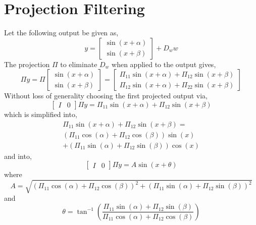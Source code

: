 \section{Projection Filtering}
Let the following output be given as,
\begin{equation}
    y=\begin{bmatrix}
        \sin(x+\alpha)\\ \sin(x+\beta)
    \end{bmatrix}+D_w w
\end{equation}
The projection $\Pi$ to eliminate $D_w$ when applied to the output gives,
\begin{equation}
    \Pi y=\Pi\begin{bmatrix}
        \sin(x+\alpha)\\ \sin(x+\beta)
    \end{bmatrix}=\begin{bmatrix}
        \Pi_{11}\sin(x+\alpha)+\Pi_{12}\sin(x+\beta)\\
        \Pi_{12}\sin(x+\alpha)+\Pi_{22}\sin(x+\beta)
    \end{bmatrix}
\end{equation}
Without loss of generality choosing the first projected output via,
\begin{equation}
    \begin{bmatrix}I& 0\end{bmatrix}\Pi y=\Pi_{11}\sin(x+\alpha)+\Pi_{12}\sin(x+\beta)
\end{equation}
which is simplified into,
\begin{gather}
   \Pi_{11}\sin(x+\alpha)+\Pi_{12}\sin(x+\beta)=\\
    \left(\Pi_{11}\cos(\alpha)+\Pi_{12}\cos(\beta)\right)\sin(x)\\
    +\left(\Pi_{11}\sin(\alpha)+\Pi_{12}\sin(\beta)\right)\cos(x)
\end{gather}
and into,
\begin{equation}
   \begin{bmatrix}I& 0\end{bmatrix}\Pi y=A\sin(x+\theta)
\end{equation}
where 
\begin{equation}
    A=\sqrt{\left(\Pi_{11}\cos(\alpha)+\Pi_{12}\cos(\beta)\right)^2+\left(\Pi_{11}\sin(\alpha)+\Pi_{12}\sin(\beta)\right)^2}
\end{equation}
and
\begin{equation}
    \theta=\tan^{-1}\left(
        \frac{\Pi_{11}\sin(\alpha)+\Pi_{12}\sin(\beta)}{\Pi_{11}\cos(\alpha)+\Pi_{12}\cos(\beta)}\right)
\end{equation}
